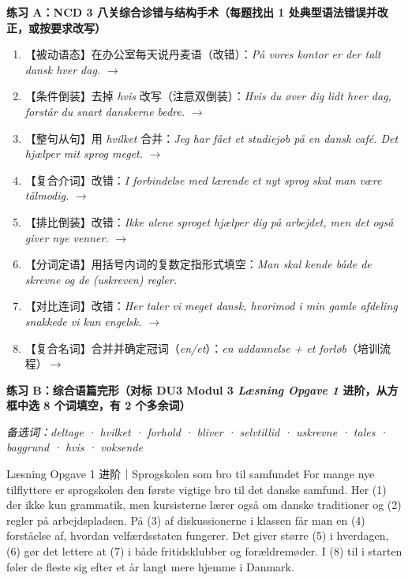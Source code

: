 \textbf{练习 A：NCD 3 八关综合诊错与结构手术（每题找出 1 处典型语法错误并改正，或按要求改写）}
\begin{enumerate}
  \item 【被动语态】在办公室每天说丹麦语（改错）：\textit{På vores kontor er der talt dansk hver dag.} $\rightarrow$
  \item 【条件倒装】去掉 \textit{hvis} 改写（注意双倒装）：\textit{Hvis du øver dig lidt hver dag, forstår du snart danskerne bedre.} $\rightarrow$
  \item 【整句从句】用 \textit{hvilket} 合并：\textit{Jeg har fået et studiejob på en dansk café. Det hjælper mit sprog meget.} $\rightarrow$
  \item 【复合介词】改错：\textit{I forbindelse med lærende et nyt sprog skal man være tålmodig.} $\rightarrow$
  \item 【排比倒装】改错：\textit{Ikke alene sproget hjælper dig på arbejdet, men det også giver nye venner.} $\rightarrow$
  \item 【分词定语】用括号内词的复数定指形式填空：\textit{Man skal kende både de skrevne og de \underline{\hspace{2.0cm}} (uskreven) regler.}
  \item 【对比连词】改错：\textit{Her taler vi meget dansk, hvorimod i min gamle afdeling snakkede vi kun engelsk.} $\rightarrow$
  \item 【复合名词】合并并确定冠词（\textit{en/et}）：\textit{en uddannelse + et forløb}（培训流程）$\rightarrow$
\end{enumerate}

\textbf{练习 B：综合语篇完形（对标 DU3 Modul 3 \textit{Læsning Opgave 1} 进阶，从方框中选 8 个词填空，有 2 个多余词）}

\textit{备选词：deltage · hvilket · forhold · bliver · selvtillid · uskrevne · tales · baggrund · hvis · voksende}

\vspace{0.2em}
\begin{emailbox}{Læsning Opgave 1 进阶｜Sprogskolen som bro til samfundet}
For mange nye tilflyttere er sprogskolen den første vigtige bro til det danske samfund. Her (1) \underline{\hspace{2.0cm}} der ikke kun grammatik, men kursisterne lærer også om danske traditioner og (2) \underline{\hspace{2.0cm}} regler på arbejdspladsen. På (3) \underline{\hspace{2.0cm}} af diskussionerne i klassen får man en (4) \underline{\hspace{2.0cm}} forståelse af, hvordan velfærdsstaten fungerer. Det giver større (5) \underline{\hspace{2.0cm}} i hverdagen, (6) \underline{\hspace{2.0cm}} gør det lettere at (7) \underline{\hspace{2.0cm}} i både fritidsklubber og forældremøder. I (8) \underline{\hspace{2.0cm}} til i starten føler de fleste sig efter et år langt mere hjemme i Danmark.
\end{emailbox}

